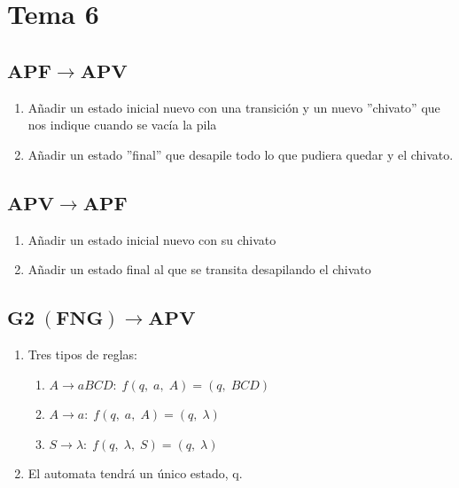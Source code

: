 \documentclass[12pt, twoside, openright]{report} %
\begin{document}
\section{Tema 6}
\subsection{$\boldsymbol{APF \rightarrow APV}$}
\begin{enumerate}
	\item Añadir un estado inicial nuevo con una transición y un nuevo ''chivato'' que nos indique cuando se vacía la pila
	\item Añadir un estado ''final'' que desapile todo lo que pudiera quedar y el chivato.
\end{enumerate}
\subsection{$\boldsymbol{APV \rightarrow APF}$}
\begin{enumerate}
	\item Añadir un estado inicial nuevo con su chivato
	\item Añadir un estado final al que se transita desapilando el chivato
\end{enumerate}

\subsection{$\boldsymbol{G2 \; (FNG) \rightarrow APV}$}
\begin{enumerate}
	\item Tres tipos de reglas:
	\begin{enumerate}
		\item $A \rightarrow aBCD: \; f(q,\; a,\; A) = (q,\; BCD)$
		\item $A \rightarrow a: \; f(q,\; a,\; A) = (q,\; \lambda)$
		\item $S \rightarrow \lambda: \; f(q,\; \lambda,\; S) = (q,\; \lambda)$
	\end{enumerate}
	\item El automata tendrá un único estado, q.
\end{enumerate}
\end{document}

